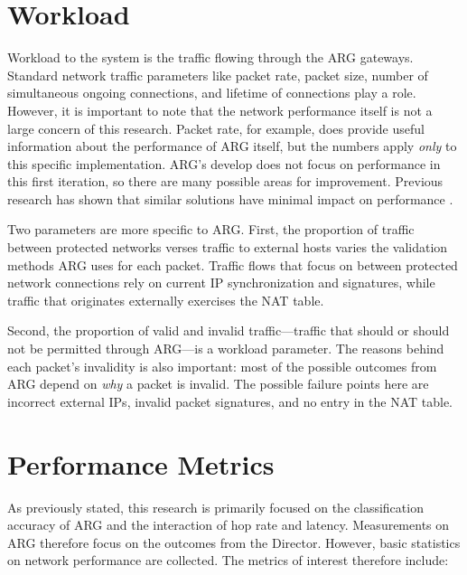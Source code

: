 \section{Workload}
\label{sec:workload}
\par Workload to the system is the traffic flowing through the \ac{ARG} gateways. Standard network traffic parameters like packet rate, packet size, number of simultaneous ongoing connections, and lifetime of connections play a role. However, it is important to note that the network performance itself is not a large concern of this research. Packet rate, for example, does provide useful information about the performance of \ac{ARG} itself, but the numbers apply \textit{only} to this specific implementation. \ac{ARG}'s develop does not focus on performance in this first iteration, so there are many possible areas for improvement. Previous research has shown that similar solutions have minimal impact on performance \cite{NAH}. 

\par Two parameters are more specific to \ac{ARG}. First, the proportion of traffic between protected networks verses traffic to external hosts varies the validation methods \ac{ARG} uses for each packet. Traffic flows that focus on between protected network connections rely on current \ac{IP} synchronization and signatures, while traffic that originates externally exercises the \ac{NAT} table.

\par Second, the proportion of valid and invalid traffic---traffic that should or should not be permitted through \ac{ARG}---is a workload parameter. The reasons behind each packet's invalidity is also important: most of the possible outcomes from \ac{ARG} depend on \textit{why} a packet is invalid. The possible failure points here are incorrect external \acp{IP}, invalid packet signatures, and no entry in the \ac{NAT} table.

\section{Performance Metrics}
\label{sec:metrics}
\par As previously stated, this research is primarily focused on the classification accuracy of \ac{ARG} and the interaction of hop rate and latency. Measurements on \ac{ARG} therefore focus on the outcomes from the Director. However, basic statistics on network performance are collected. The metrics of interest therefore include:

